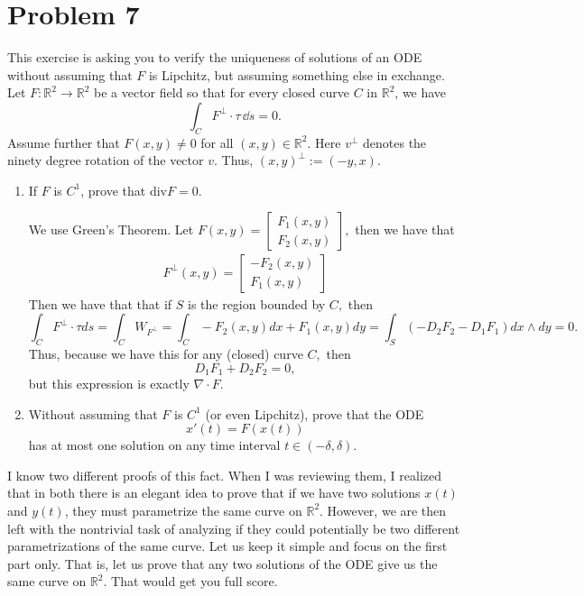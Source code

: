 \documentclass[11pt]{article}
\newcommand{\bbR}{\mathbb{R}}
\begin{document}
\newpage
\section*{Problem 7}
\begin{problem}
    This exercise is asking you to verify the uniqueness of solutions of an ODE without
assuming that $F$ is Lipchitz, but assuming something else in exchange.
Let $F : \bbR^2 \to \bbR^2$ be a vector field so that for every closed curve $C$ in $\bbR^2$, we have
\[ \int_C F^\perp \cdot \tau \, \dd s = 0.\]
Assume further that $F(x,y) \neq 0$ for all $(x,y) \in \bbR^2$.
Here $v^\perp$ denotes the ninety degree rotation of the vector $v$. Thus, $(x,y)^\perp := (-y,x)$.
\begin{enumerate}
\item If $F$ is $C^1$, prove that $\mathrm{div } F = 0$.
\begin{solution}
    We use Green's Theorem. Let $F(x,y) = \begin{bmatrix}
        F_1(x,y)\\
        F_2(x,y)
    \end{bmatrix},$ then we have that 
    \begin{align}
        F^\perp(x,y) = \begin{bmatrix}
        -F_2(x,y)\\ F_1(x,y)
    \end{bmatrix}
    \end{align}
    Then we have that that if $S$ is the region bounded by $C,$ then
    \[\int_C F^\perp \cdot \tau ds = \int_C W_{F^\perp} = \int_C -F_2(x,y)dx + F_1(x,y)dy = \int_S \left(-D_2F_2 - D_1F_1\right)dx \wedge dy = 0.\] Thus, because we have this for any (closed) curve $C,$ then
    \[D_1F_1+ D_2F_2 = 0,\] but this expression is exactly $\nabla \cdot F.$
\end{solution}
\item Without assuming that $F$ is $C^1$ (or even Lipchitz), prove that the
ODE
\[ x'(t) = F(x(t))\]
has at most one solution on any time interval $t \in (-\delta,\delta)$.
\end{enumerate}
I know two different proofs of this fact. When I was reviewing them, I
realized that in both there is an elegant idea to prove that if we have two
solutions $x(t)$ and $y(t)$, they must parametrize the same curve on $\bbR^2$.
However, we are then left with the nontrivial task of analyzing if they could
potentially be two different parametrizations of the same curve.
Let us keep it simple and focus on the first part only. That is, let us prove that
any two solutions of the ODE give us the same curve on $\bbR^2$. That would get you
full score.\\


\end{problem}
\end{document}
